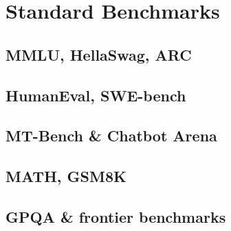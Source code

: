 
\section{Standard Benchmarks}

\subsection{MMLU, HellaSwag, ARC}


\subsection{HumanEval, SWE-bench}


\subsection{MT-Bench \& Chatbot Arena}


\subsection{MATH, GSM8K}


\subsection{GPQA \& frontier benchmarks}


